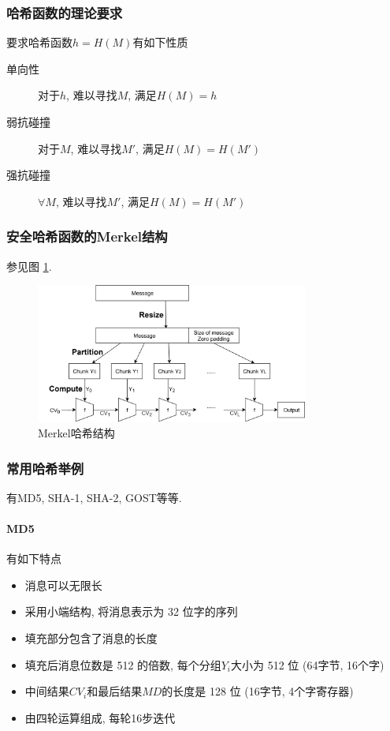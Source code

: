 \documentclass{ctexart}
\begin{document}
\subsubsection{哈希函数的理论要求}
    要求哈希函数$h = H(M)$有如下性质 \begin{description}
        \item[单向性] 对于$h$, 难以寻找$M$, 满足$H(M) = h$
        \item[弱抗碰撞] 对于$M$, 难以寻找$M'$, 满足$H(M) = H(M')$
        \item[强抗碰撞] $\forall M$, 难以寻找$M'$, 满足$H(M) = H(M')$
    \end{description}
\subsubsection{安全哈希函数的Merkel结构}
    参见图 \ref{merkel-hash}.
    \begin{figure}[ht!]
    \centering
    \includegraphics[width=0.8\textwidth]{merkel-hash}
    \caption{Merkel哈希结构}
    \label{merkel-hash}
    \end{figure}
\subsubsection{常用哈希举例} 有MD5, SHA-1, SHA-2, GOST等等.
\paragraph{MD5} 有如下特点 \begin{itemize}
        \item 消息可以无限长
        \item 采用小端结构, 将消息表示为 32 位字的序列
        \item 填充部分包含了消息的长度
        \item 填充后消息位数是 512 的倍数, 每个分组$Y_i$大小为 512 位 (64字节, 16个字)
        \item 中间结果$CV_i$和最后结果$MD$的长度是 128 位 (16字节, 4个字寄存器)
        \item 由四轮运算组成, 每轮16步迭代
    \end{itemize}
\end{document}
